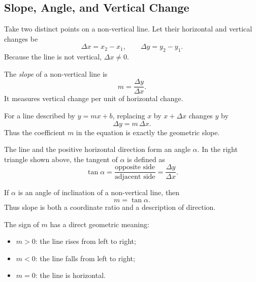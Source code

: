 \subsection{Slope, Angle, and Vertical Change}

Take two distinct points on a non-vertical line. Let their horizontal and
vertical changes be
\[
\Delta x=x_2-x_1,
\qquad
\Delta y=y_2-y_1.
\]
Because the line is not vertical, $\Delta x\neq 0$.

\begin{definitionbox}
The \emph{slope} of a non-vertical line is
\[
\boxed{m=\frac{\Delta y}{\Delta x}}.
\]
It measures vertical change per unit of horizontal change.
\end{definitionbox}

For a line described by $y=mx+b$, replacing $x$ by $x+\Delta x$ changes $y$ by
\[
\Delta y=m\,\Delta x.
\]
Thus the coefficient $m$ in the equation is exactly the geometric slope.

\begin{center}
\end{center}

The line and the positive horizontal direction form an angle $\alpha$. In the
right triangle shown above, the tangent of $\alpha$ is defined as
\[
\tan\alpha
=
\frac{\text{opposite side}}{\text{adjacent side}}
=
\frac{\Delta y}{\Delta x}.
\]

\begin{theorembox}
If $\alpha$ is an angle of inclination of a non-vertical line, then
\[
\boxed{m=\tan\alpha}.
\]
Thus slope is both a coordinate ratio and a description of direction.
\end{theorembox}

The sign of $m$ has a direct geometric meaning:
\begin{itemize}
    \item $m>0$: the line rises from left to right;
    \item $m<0$: the line falls from left to right;
    \item $m=0$: the line is horizontal.
\end{itemize}

